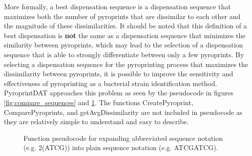 \documentclass[12pt]{ucthesis}
\begin{document}
      More formally, a best dispensation sequence is a dispensation sequence
      that maximizes both the number of pyroprints that are dissimilar to each
      other and the magnitude of these dissimilarities. It should be
      noted that this definition of a best dispensation is \textbf{not} the
      same as a dispensation sequence that minimizes the similarity between
      pyroprints, which may lead to the selection of a dispensation sequence
      that is able to strongly differentiate between only a few pyroprints. By
      selecting a dispensation sequence for the pyroprinting process that
      maximizes the dissimilarity between pyroprints, it is possible to improve
      the sensitivity and effectiveness of pyroprinting as a bacterial strain
      identification method. PyroprintDAT approaches this problem as seen by
      the pseudocode in figures \ref{fig:compare_sequences} and
      \ref{fig:generate_sequences}. The functions \textsf{CreatePyroprint},
      \textsf{ComparePyroprints}, and \textsf{getAvgDissimilarity} are not
      included in pseudocode as they are relatively simple to understand and
      easy to describe.

      \begin{figure}[!t]
         \centering
         \caption{Function pseudocode for expanding abbreviated sequence
                  notation (e.g. 2(ATCG)) into plain sequence notation (e.g.
                  ATCGATCG).}
         \label{fig:generate_sequences}
      \end{figure}
\end{document}
